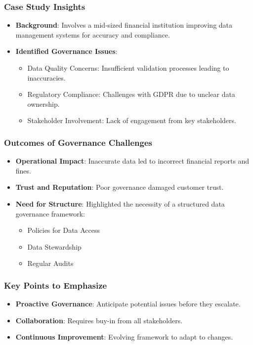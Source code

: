 \documentclass[aspectratio=169]{beamer}
\begin{document}
\begin{frame}[fragile]
    \frametitle{Case Study Insights}
    \begin{itemize}
        \item \textbf{Background}: Involves a mid-sized financial institution improving data management systems for accuracy and compliance.
        \item \textbf{Identified Governance Issues}:
        \begin{itemize}
            \item Data Quality Concerns: Insufficient validation processes leading to inaccuracies.
            \item Regulatory Compliance: Challenges with GDPR due to unclear data ownership.
            \item Stakeholder Involvement: Lack of engagement from key stakeholders.
        \end{itemize}
    \end{itemize}
\end{frame}

\begin{frame}[fragile]
    \frametitle{Outcomes of Governance Challenges}
    \begin{itemize}
        \item \textbf{Operational Impact}: Inaccurate data led to incorrect financial reports and fines.
        \item \textbf{Trust and Reputation}: Poor governance damaged customer trust.
        \item \textbf{Need for Structure}: Highlighted the necessity of a structured data governance framework:
        \begin{itemize}
            \item Policies for Data Access
            \item Data Stewardship
            \item Regular Audits
        \end{itemize}
    \end{itemize}
\end{frame}

\begin{frame}[fragile]
    \frametitle{Key Points to Emphasize}
    \begin{itemize}
        \item \textbf{Proactive Governance}: Anticipate potential issues before they escalate.
        \item \textbf{Collaboration}: Requires buy-in from all stakeholders.
        \item \textbf{Continuous Improvement}: Evolving framework to adapt to changes.
    \end{itemize}
\end{frame}
\end{document}
